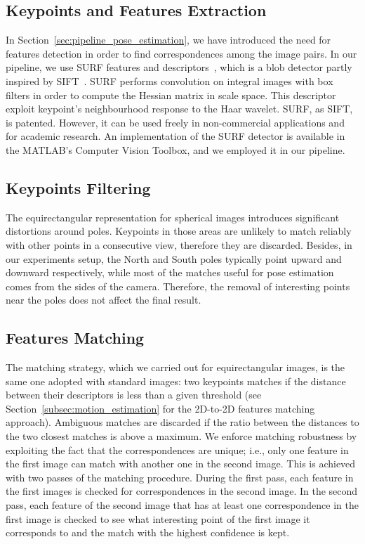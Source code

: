 \subsection{Keypoints and Features Extraction}
In Section~\ref{sec:pipeline_pose_estimation}, we have introduced the need for 
features detection in order to find correspondences among the image pairs.
In our pipeline, we use SURF features and descriptors~\cite{bay2006surf},
which is a blob detector partly inspired by SIFT~\cite{lowe1999object}.
SURF performs convolution on integral images with box filters in order to 
compute the Hessian matrix in scale space.
This descriptor exploit keypoint's neighbourhood response to the Haar wavelet.
SURF, as SIFT, is patented. However, it can be used freely in non-commercial
applications and for academic research.
An implementation of the SURF detector is available in the MATLAB's Computer 
Vision Toolbox, and we employed it in our pipeline.

\subsection{Keypoints Filtering}
The equirectangular representation for spherical images introduces significant 
distortions around poles. Keypoints in those areas 
are unlikely to match reliably with other points in a consecutive view, therefore they are discarded.
Besides, in our experiments setup, the North and South poles typically point 
upward and downward respectively, while most of the matches useful for pose 
estimation comes from the sides of the camera. Therefore, the removal of interesting 
points near the poles does not affect the final result.

\subsection{Features Matching}\label{subsec:feature_matching}
The matching strategy, which we carried out for equirectangular images, is the same one 
adopted with standard images: two keypoints matches if the distance between 
their descriptors is less than a given threshold
(see Section~\ref{subsec:motion_estimation} for the 2D-to-2D features matching
approach). Ambiguous matches 
are discarded if the ratio between the distances to the two closest matches is 
above a maximum.
We enforce matching robustness by exploiting the fact that the correspondences are unique; i.e., only one feature in the first image can match with another one in the second image. This is achieved with two passes of the matching procedure. During the 
first pass, each feature in the first images is checked for correspondences in
the second image. In the second pass, each feature of the second image that 
has at least one correspondence in the first image is checked to see what 
interesting point of the first image it corresponds to and the match with the
highest confidence is kept.

